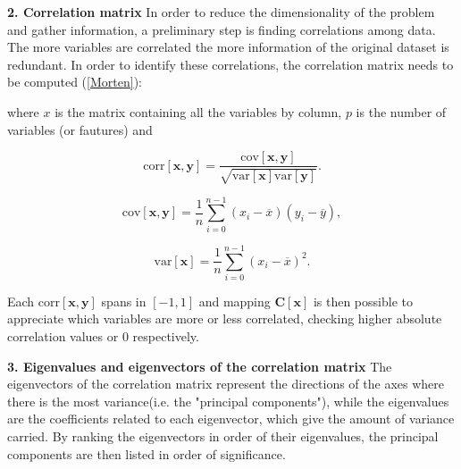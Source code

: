 \documentclass[english,notitlepage,reprint,nofootinbib]{revtex4-1}  %
\begin{document}
\textbf{2. Correlation matrix} In order to reduce the dimensionality of the problem and gather information, a preliminary step is finding correlations among data. The more variables are correlated the more information of the original dataset is redundant. In order to identify these correlations, the correlation matrix needs to be computed (\ref{Morten}):


where $x$ is the matrix containing all the variables by column, $p$ is the number of variables (or fautures) and 

$$
\mathrm{corr}[\boldsymbol{x},\boldsymbol{y}]=\frac{\mathrm{cov}[\boldsymbol{x},\boldsymbol{y}]}{\sqrt{\mathrm{var}[\boldsymbol{x}] \mathrm{var}[\boldsymbol{y}]}}.
$$

$$
\mathrm{cov}[\boldsymbol{x},\boldsymbol{y}] =\frac{1}{n} \sum_{i=0}^{n-1}(x_i- \overline{x})(y_i- \overline{y}),
$$

$$
\mathrm{var}[\boldsymbol{x}]=\frac{1}{n} \sum_{i=0}^{n-1}(x_i- \overline{x})^2.
$$

Each $\mathrm{corr}[\boldsymbol{x},\boldsymbol{y}]$ spans in $[-1,1]$ and mapping $\boldsymbol{C}[\boldsymbol{x}]$ is then possible to appreciate which variables are more or less correlated, checking higher absolute correlation values or 0 respectively.

\textbf{3. Eigenvalues and eigenvectors of the correlation matrix}
The eigenvectors of the correlation matrix represent the directions of the axes where there is the most variance(i.e. the "principal components"), while the eigenvalues are the coefficients related to each eigenvector, which give the amount of variance carried. By ranking the eigenvectors in order of their eigenvalues, the principal components are then listed in order of significance.
\end{document}
